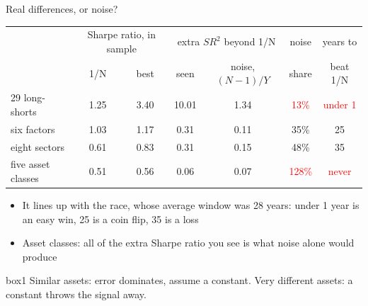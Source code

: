 \documentclass[aspectratio=169,10pt]{beamer}
\begin{document}
\begin{frame}{Real differences, or noise?}
\vskip 2pt
\begin{center}
\renewcommand{\arraystretch}{1.3}
\begin{tabular}{lcccccc}
\toprule
 & \multicolumn{2}{c}{Sharpe ratio, in sample} & \multicolumn{2}{c}{extra $SR^{2}$ beyond 1/N} & noise & years to \\
 & 1/N & best & seen & noise, $(N-1)/Y$ & share & beat 1/N \\
\midrule
29 long-shorts & 1.25 & 3.40 & 10.01 & 1.34 & \textcolor{red}{13\%} & \textcolor{red}{under 1} \\
six factors & 1.03 & 1.17 & 0.31 & 0.11 & 35\% & 25 \\
eight sectors & 0.61 & 0.83 & 0.31 & 0.15 & 48\% & 35 \\
five asset classes & 0.51 & 0.56 & 0.06 & 0.07 & \textcolor{red}{128\%} & \textcolor{red}{never} \\
\bottomrule
\end{tabular}
\end{center}
\vskip 8pt
\begin{itemize}
\item It lines up with the race, whose average window was 28 years: under 1 year is an easy win, 25 is a coin flip, 35 is a loss
\vskip 5pt
\item Asset classes: all of the extra Sharpe ratio you see is what noise alone would produce
\end{itemize}
\vskip 6pt
\begin{beamercolorbox}[rounded=true,sep=7pt,center]{box1}
Similar assets: error dominates, assume a constant. Very different assets: a constant throws the signal away.
\end{beamercolorbox}
\end{frame}
\end{document}
